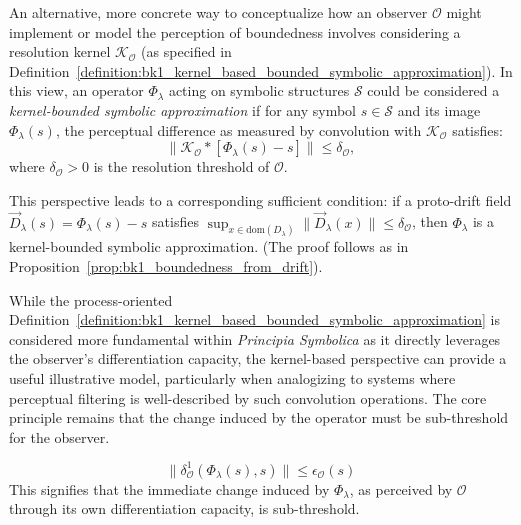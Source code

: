 \begin{remark}
An alternative, more concrete way to conceptualize how an observer $\mathcal{O}$ might implement or model the perception of boundedness involves considering a resolution kernel $\mathcal{K}_\mathcal{O}$ (as specified in Definition~\ref{definition:bk1_kernel_based_bounded_symbolic_approximation}).  
In this view, an operator $\Phi_\lambda$ acting on symbolic structures $\mathcal{S}$ could be considered a \emph{kernel-bounded symbolic approximation} if for any symbol $s \in \mathcal{S}$ and its image $\Phi_\lambda(s)$, the perceptual difference as measured by convolution with $\mathcal{K}_\mathcal{O}$ satisfies:
\[
\|\mathcal{K}_\mathcal{O} \ast [\Phi_\lambda(s) - s]\| \leq \delta_\mathcal{O},
\]
where $\delta_\mathcal{O} > 0$ is the resolution threshold of $\mathcal{O}$.

This perspective leads to a corresponding sufficient condition: if a proto-drift field $\vec{D}_\lambda(s) = \Phi_\lambda(s) - s$ satisfies $\sup_{x \in \mathrm{dom}(D_\lambda)} \|\vec{D}_\lambda(x)\| \leq \delta_\mathcal{O}$, then $\Phi_\lambda$ is a kernel-bounded symbolic approximation. (The proof follows as in Proposition~\ref{prop:bk1_boundedness_from_drift}).

While the process-oriented Definition~\ref{definition:bk1_kernel_based_bounded_symbolic_approximation} is considered more fundamental within \textit{Principia Symbolica} as it directly leverages the observer's differentiation capacity, the kernel-based perspective can provide a useful illustrative model, particularly when analogizing to systems where perceptual filtering is well-described by such convolution operations. The core principle remains that the change induced by the operator must be sub-threshold for the observer.
\end{remark}

\begin{equation}
    \|\delta^1_{\mathcal{O}}(\Phi_\lambda(s), s)\| \leq \epsilon_{\mathcal{O}}(s)
\end{equation}
This signifies that the immediate change induced by $\Phi_\lambda$, as perceived by $\mathcal{O}$ through its own differentiation capacity, is sub-threshold.

